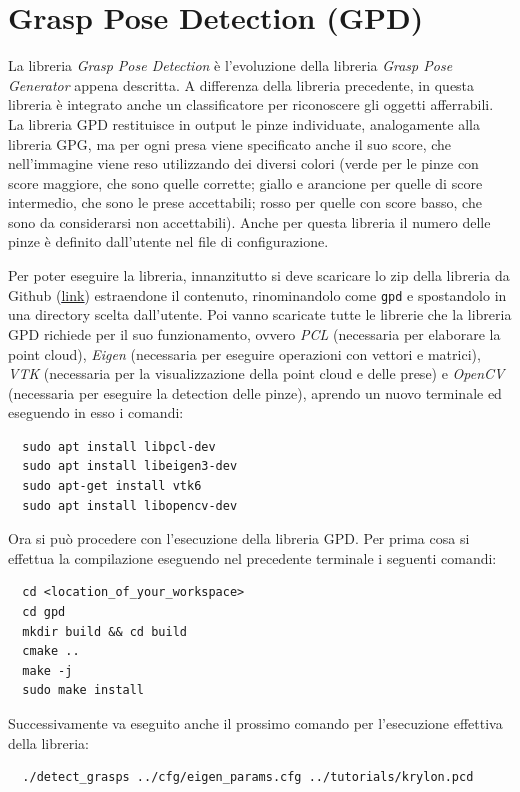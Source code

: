 \documentclass{report}
\begin{document}
\section{Grasp Pose Detection (GPD)}\label{GPD}
La libreria \textit{Grasp Pose Detection} è l'evoluzione della libreria \textit{Grasp Pose Generator} appena descritta. A differenza della libreria precedente, in questa libreria è integrato anche un classificatore per riconoscere gli oggetti afferrabili. La libreria GPD restituisce in output le pinze individuate, analogamente alla libreria GPG, ma per ogni presa viene specificato anche il suo score, che nell'immagine viene reso utilizzando dei diversi colori (verde per le pinze con score maggiore, che sono quelle corrette; giallo e arancione per quelle di score intermedio, che sono le prese accettabili; rosso per quelle con score basso, che sono da considerarsi non accettabili). Anche per questa libreria il numero delle pinze è definito dall'utente nel file di configurazione. \par
Per poter eseguire la libreria, innanzitutto si deve scaricare lo zip della libreria da Github (\textcolor{blue}{\underline{\href{https://github.com/atenpas/gpd}{link}}}) estraendone il contenuto, rinominandolo come \texttt{gpd} e spostandolo in una directory scelta dall'utente. Poi vanno scaricate tutte le librerie che la libreria GPD richiede per il suo funzionamento, ovvero \textit{PCL} (necessaria per elaborare la point cloud), \textit{Eigen} (necessaria per eseguire operazioni con vettori e matrici), \textit{VTK} (necessaria per la visualizzazione della point cloud e delle prese) e \textit{OpenCV} (necessaria per eseguire la detection delle pinze), aprendo un nuovo terminale ed eseguendo in esso i comandi:
\begin{verbatim}
  sudo apt install libpcl-dev
  sudo apt install libeigen3-dev
  sudo apt-get install vtk6
  sudo apt install libopencv-dev
\end{verbatim}
Ora si può procedere con l'esecuzione della libreria GPD. Per prima cosa si effettua la compilazione eseguendo nel precedente terminale i seguenti comandi:
\begin{verbatim}
  cd <location_of_your_workspace> 
  cd gpd
  mkdir build && cd build
  cmake ..
  make -j
  sudo make install
\end{verbatim}
Successivamente va eseguito anche il prossimo comando per l'esecuzione effettiva della libreria:
\begin{verbatim}
  ./detect_grasps ../cfg/eigen_params.cfg ../tutorials/krylon.pcd
\end{verbatim}
\end{document}
